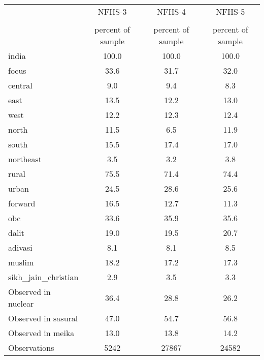 {
\def\sym#1{\ifmmode^{#1}\else\(^{#1}\)\fi}
\begin{tabular}{l*{3}{c}}
\toprule
                    &      NFHS-3&      NFHS-4&      NFHS-5\\
                    &\multicolumn{1}{c}{}&\multicolumn{1}{c}{}&\multicolumn{1}{c}{}\\
                    &percent of sample&percent of sample&percent of sample\\
\midrule
india               &       100.0&       100.0&       100.0\\
focus               &        33.6&        31.7&        32.0\\
central             &         9.0&         9.4&         8.3\\
east                &        13.5&        12.2&        13.0\\
west                &        12.2&        12.3&        12.4\\
north               &        11.5&         6.5&        11.9\\
south               &        15.5&        17.4&        17.0\\
northeast           &         3.5&         3.2&         3.8\\
rural               &        75.5&        71.4&        74.4\\
urban               &        24.5&        28.6&        25.6\\
forward             &        16.5&        12.7&        11.3\\
obc                 &        33.6&        35.9&        35.6\\
dalit               &        19.0&        19.5&        20.7\\
adivasi             &         8.1&         8.1&         8.5\\
muslim              &        18.2&        17.2&        17.3\\
sikh\_jain\_christian &         2.9&         3.5&         3.3\\
Observed in nuclear &        36.4&        28.8&        26.2\\
Observed in sasural &        47.0&        54.7&        56.8\\
Observed in meika   &        13.0&        13.8&        14.2\\
\midrule
Observations        &        5242&       27867&       24582\\
\bottomrule
\end{tabular}
}
